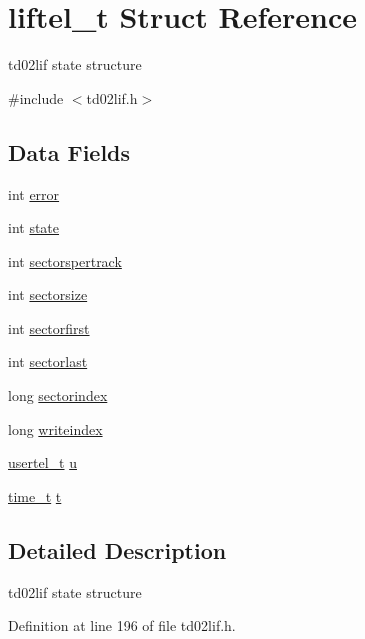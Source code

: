 \hypertarget{structliftel__t}{}\section{liftel\+\_\+t Struct Reference}
\label{structliftel__t}


td02lif state structure  




{\ttfamily \#include $<$td02lif.\+h$>$}

\subsection*{Data Fields}
\begin{DoxyCompactItemize}
\item 
int \hyperlink{structliftel__t_abc69ee3835be72037c41a11b7457cecd}{error}
\item 
int \hyperlink{structliftel__t_a579b9a2411fc6cf4bcdd4cac15d48e49}{state}
\item 
int \hyperlink{structliftel__t_a69b69f0cd2e8f0017178bafd5a7a7585}{sectorspertrack}
\item 
int \hyperlink{structliftel__t_aaf7b830b7b2791c56c83082bb9dba7d9}{sectorsize}
\item 
int \hyperlink{structliftel__t_a28dddd09745822ae834b073ad3c3bd98}{sectorfirst}
\item 
int \hyperlink{structliftel__t_aae9fb3e37531df4dfdf0b2906ec95026}{sectorlast}
\item 
long \hyperlink{structliftel__t_a13e9f8b2e23d8f028f456d4465beb4d5}{sectorindex}
\item 
long \hyperlink{structliftel__t_a3c5f11408ea86ded8a0bc0d20a0ea689}{writeindex}
\item 
\hyperlink{structusertel__t}{usertel\+\_\+t} \hyperlink{structliftel__t_a3a8a41c9a51c6450ac562d525103902a}{u}
\item 
\hyperlink{time_8h_a3346b04b0420b32ccf6b706551b70762}{time\+\_\+t} \hyperlink{structliftel__t_a19ad0aafb060bc0262c7946220f0c407}{t}
\end{DoxyCompactItemize}


\subsection{Detailed Description}
td02lif state structure 

Definition at line 196 of file td02lif.\+h.



